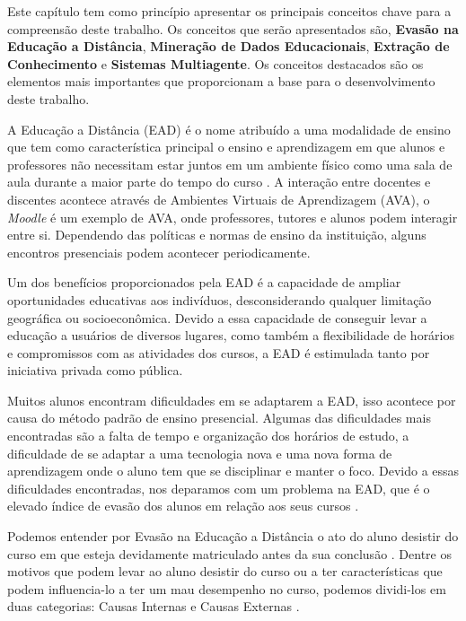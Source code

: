 \label{sec:fundamentacao}

Este capítulo tem como princípio apresentar os principais conceitos chave para a compreensão deste trabalho. Os conceitos que serão apresentados são, \textbf{Evasão na Educação a Distância}, \textbf{Mineração de Dados Educacionais}, \textbf{Extração de Conhecimento} e \textbf{Sistemas Multiagente}. Os conceitos destacados são os elementos mais importantes que proporcionam a base para o desenvolvimento deste trabalho.

\label{sec:evasao}

A Educação a Distância (EAD) é o nome atribuído a uma modalidade de ensino que tem como característica principal o ensino e aprendizagem em que alunos e professores não necessitam estar juntos em um ambiente físico como uma sala de aula durante a maior parte do tempo do curso \cite{cambruzzi2014gvwise}. A interação entre docentes e discentes acontece através de Ambientes Virtuais de Aprendizagem (AVA), o \textit{Moodle} é um exemplo de AVA, onde professores, tutores e alunos podem interagir entre si. Dependendo das políticas e normas de ensino da instituição, alguns encontros presenciais podem acontecer periodicamente.

Um dos benefícios proporcionados pela EAD é a capacidade de ampliar oportunidades educativas aos indivíduos, desconsiderando qualquer limitação geográfica ou socioeconômica. Devido a essa capacidade de conseguir levar a educação a usuários de diversos lugares, como também a flexibilidade de horários e compromissos com as atividades dos cursos, a EAD é estimulada tanto por iniciativa privada como pública.

Muitos alunos encontram dificuldades em se adaptarem a EAD, isso acontece por causa do método padrão de ensino presencial. Algumas das dificuldades mais encontradas são a falta de tempo e organização dos horários de estudo, a dificuldade de se adaptar a uma tecnologia nova e uma nova forma de aprendizagem onde o aluno tem que se disciplinar e manter o foco. Devido a essas dificuldades encontradas, nos deparamos com um problema na EAD, que é o elevado índice de evasão dos alunos em relação aos seus cursos \cite{kampff2009mineraccao}.

Podemos entender por Evasão na Educação a Distância o ato do aluno desistir do curso em que esteja devidamente matriculado antes da sua conclusão \cite{cambruzzi2014gvwise}. Dentre os motivos que podem levar ao aluno desistir do curso ou a ter características que podem influencia-lo a ter um mau desempenho no curso, podemos dividi-los em duas categorias: Causas Internas e Causas Externas \cite{kampff2009mineraccao}.

